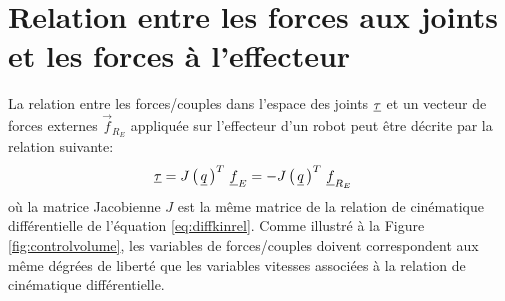 \section{Relation entre les forces aux joints et les forces à l'effecteur}
\label{sec:manipstatic}

La relation entre les forces/couples dans l'espace des joints $\underline{\tau}$ et un vecteur de forces externes $\vec{f}_{R_E}$ appliquée sur l'effecteur d'un robot peut être décrite par la relation suivante:
\begin{align}
\underline{\tau} &= J\left( \, \underline{q} \, \right)^T \, \underline{f}_E = -J\left( \, \underline{q} \, \right)^T \, \underline{f}_{R_E}
\label{eq:staticmanipulator}
\end{align}
où la matrice Jacobienne $J$ est la même matrice de la relation de cinématique différentielle de l'équation \ref{eq:diffkinrel}. Comme illustré à la Figure \ref{fig:controlvolume}, les variables de forces/couples doivent correspondent aux même dégrées de liberté que les variables vitesses associées à la relation de cinématique différentielle. 




